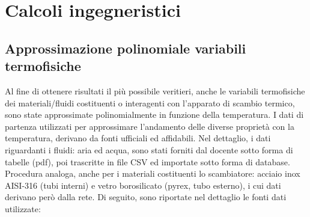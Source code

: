 \documentclass[a4paper,10pt]{article}                                                                                       %
\begin{document}
\section{Calcoli ingegneristici}                                                                                            %
\label{sec:engineering_calcs}                                                                                               %
\subsection{Approssimazione polinomiale variabili termofisiche}                                                             %
\label{subsec:thermovars_polyapprox}                                                                                        %
  Al fine di ottenere risultati il più possibile veritieri, anche le variabili termofisiche dei materiali/fluidi
  costituenti o interagenti con l'apparato di scambio termico, sono state approssimate polinomialmente in funzione della
  temperatura. I dati di partenza utilizzati per approssimare l'andamento delle diverse proprietà con la temperatura,
  derivano da fonti ufficiali ed affidabili. Nel dettaglio, i dati riguardanti i fluidi: aria ed acqua, sono stati forniti
  dal docente sotto forma di tabelle (pdf), poi trascritte in file CSV ed importate sotto forma di database. Procedura
  analoga, anche per i materiali costituenti lo scambiatore: acciaio inox AISI-316 (tubi interni) e vetro borosilicato
  (pyrex, tubo esterno), i cui dati derivano però dalla rete. Di seguito, sono riportate nel dettaglio le fonti dati
  utilizzate:
\end{document}
